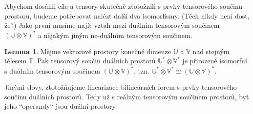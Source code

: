 \documentclass[a5paper,12pt]{amsbook}
\theoremstyle{definition}
\newtheorem{lemma}[theorem]{Lemma}
\newcommand{\myspace}[1]{\mathbb{#1}}
\begin{document}
Abychom dosáhli cíle a tensory skutečně ztotožnili s prvky tensorového součinu prostorů, budeme
potřebovat nalézt další dva isomorfismy. (Těch nikdy není dost, že?) Jako první musíme najít
vztah mezi duálním tensorovým součinem $(\myspace{U}\otimes\myspace{V})^*$ a nějakým jiným
ne-duálním tensorovým součinem.

\begin{lemma}
Mějme vektorové prostory konečné dimenze $\myspace{U}$ a $\myspace{V}$ nad stejným tělesem $\myspace{T}$.
Pak tensorový součin duálních prostorů $\myspace{U^*}\otimes\myspace{V^*}$ je přirozeně isomorfní
s duálním tensorovým součinem $(\myspace{U}\otimes\myspace{V})^*$,
tzn. $\myspace{U^*}\otimes\myspace{V^*}\cong(\myspace{U}\otimes\myspace{V})^*$.
\end{lemma}

Jinými slovy, ztotožňujeme linearizace bilineárních forem s prvky tensorového součinu duálních
prostorů. Tedy už s reálným tensorovým součinem prostorů, byť jeho ``operandy`` jsou duální
prostory.
\end{document}
